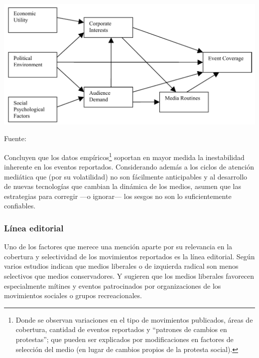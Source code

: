 \documentclass[letterpaper, 11pt]{book}
\theoremstyle{definition}
\theoremstyle{remark}
\begin{document}
\begin{minipage}{\linewidth}
\centering
{} \label{2.2_modeloSesgo}
\includegraphics[scale=0.3]{img/2.2_modeloSesgo.png}
\par\bigskip
\small Fuente: \citep[8]{2005_Ortiz_NewspaperData}
\end{minipage}\bigskip


Concluyen que los datos empíricos\footnote{Donde se observan variaciones en el tipo de movimientos publicados, áreas de cobertura, cantidad de eventos reportados y ``patrones de cambios en protestas''; que pueden ser explicados por modificaciones en factores de selección del medio (en lugar de cambios propios de la protesta social).} soportan en mayor medida la inestabilidad inherente en los eventos reportados. Considerando además a los ciclos de atención mediática que (por su volatilidad) no son fácilmente anticipables y al desarrollo de nuevas tecnologías que cambian la dinámica de los medios, asumen que las estrategias para corregir ---o ignorar--- los sesgos no son lo suficientemente confiables.



\subsubsection{Línea editorial}
\label{sec:Sesgo_lineaEditorial}

Uno de los factores que merece una mención aparte por su relevancia en la cobertura y selectividad de los movimientos reportados es la línea editorial. 
Según \citet{2014_Hutter_AEP} varios estudios indican que medios liberales o de izquierda radical son menos selectivos que medios conservadores. 
Y \citet{1999_OliverMyers_LocalNewspapers} sugieren que los medios liberales favorecen especialmente mítines y eventos patrocinados por organizaciones de los movimientos sociales o grupos recreacionales.
\end{document}
